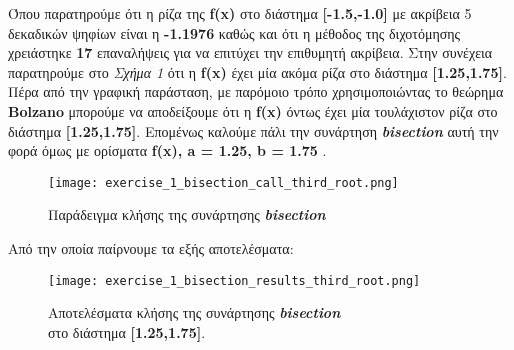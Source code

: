 \documentclass[First Project.tex]{subfiles}
\begin{document}
Όπου παρατηρούμε ότι η ρίζα της \textlatin{\textbf{f(x)}} στο διάστημα \textlatin{\textbf{[-1.5,-1.0]}} με ακρίβεια 5 δεκαδικών ψηφίων 
είναι η \textbf{-1.1976} καθώς και ότι η μέθοδος της διχοτόμησης χρειάστηκε \textbf{17} επαναλήψεις για να επιτύχει την επιθυμητή ακρίβεια.
Στην συνέχεια παρατηρούμε στο \textit{Σχήμα 1} ότι η \textlatin{\textbf{f(x)}} έχει μία ακόμα ρίζα στο διάστημα \textlatin{\textbf{[1.25,1.75]}}.
Πέρα από την γραφική παράσταση, με παρόμοιο τρόπο χρησιμοποιώντας το θεώρημα \textlatin{\textbf{Bolzano}} μπορούμε να αποδείξουμε ότι η
\textlatin{\textbf{f(x)}} όντως έχει μία τουλάχιστον ρίζα στο διάστημα \textlatin{\textbf{[1.25,1.75]}}. Επομένως καλούμε πάλι την συνάρτηση
\textit{\textlatin{\textbf{bisection}}} αυτή την φορά όμως με ορίσματα \textlatin{\textbf{f(x), a = 1.25, b = 1.75 }}.
\vspace{5px}
\begin{figure}[h!]
    \centering
    \captionsetup{justification=centering}
    \begin{center}
        \texttt{[image: exercise\_1\_bisection\_call\_third\_root.png]}    
        \caption{Παράδειγμα κλήσης της συνάρτησης \textit{\textlatin{\textbf{bisection}}}}
    \end{center}
\end{figure}

Από την οποία παίρνουμε τα εξής αποτελέσματα:
\begin{figure}[h!]
    \centering
    \captionsetup{justification=centering}
    \begin{center}
    \texttt{[image: exercise\_1\_bisection\_results\_third\_root.png]}    
    \caption{ Αποτελέσματα κλήσης της συνάρτησης \textit{\textlatin{\textbf{bisection}}} \\ στο διάστημα \textlatin{\textbf{[1.25,1.75]}}. }
    \end{center}
\end{figure}
\end{document}
